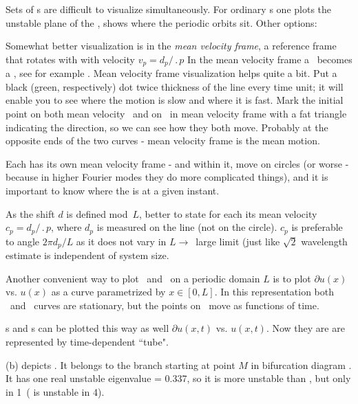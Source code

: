 Sets of \rpo s are difficult to visualize simultaneously.
For ordinary \po s one
plots the unstable plane of the \eqv, shows where the periodic
orbits sit. Other options:

Somewhat better visualization is in the
{\em mean velocity frame}, {\ie}
a reference frame that rotates with with velocity
$v_p=d_p/\period{p}$
In the mean velocity frame a \rpo\ becomes
a \po, see  for example .
Mean velocity frame visualization helps quite a bit.
Put a black (green, respectively) dot
twice thickness of the line every time unit; it will enable you to see
where the motion is slow and where it is fast.
Mark the initial point on both
mean velocity \rpo\ and on \eqv\  in mean velocity
 frame with a fat triangle
indicating the direction, so we can see how they both move. Probably at the
opposite ends of the two curves - mean velocity frame is the mean motion.


Each {\rpo} has its own mean velocity frame - and within it, {\eqv}
move on circles (or worse - because in higher Fourier modes they do more
complicated things), and it is important to know where the {\eqv} is at
a given instant.

As the shift $d$ is defined mod~$L$, better to
state for each {\rpo} its mean velocity $c_p = d_p/\period{p}$,
where $d_p$ is measured on the line (not on the circle). $c_p$ is
preferable to angle $2\pi d_p/L$ as it does not vary in $L \to$~large
limit (just like $\sqrt{2}$ wavelength estimate is independent of
system size.

Another convenient way to plot \eqva\ and \reqva\ on a periodic
domain $L$ is to plot
$\partial u(x)$ vs. $u(x)$ as a curve parametrized by
$x\in [0,L]$. In this representation both \eqva\ and \reqva\ curves are
stationary, but the points on \reqva\ move as functions of time.

\Po s and \rpo s can be plotted this way as well
$\partial u(x,t)$ vs. $u(x,t)$. Now they are are represented by time-dependent
``tube".

(b)
depicts .
It belongs to the branch starting at point $M$
in bifurcation diagram .
It has one real unstable eigenvalue = 0.337,
so it is more unstable than ,
but only in 1\dmn\ ( is unstable in 4\dmn).

